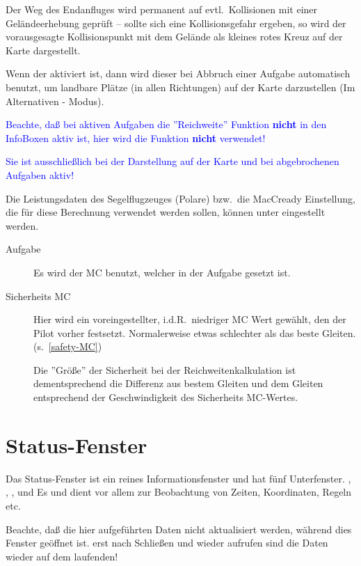 Der Weg des Endanfluges wird permanent auf evtl.\ Kollisionen mit einer Geländeerhebung geprüft -- sollte sich eine Kollisionsgefahr ergeben, so wird der vorausgesagte Kollisionspunkt mit dem Gelände als kleines rotes Kreuz auf der Karte dargestellt.

Wenn der  aktiviert ist, dann wird dieser bei Abbruch einer Aufgabe  automatisch benutzt, um landbare Plätze (in allen Richtungen) auf der Karte darzustellen (Im Alternativen - Modus).


\textcolor{blue}{Beachte, daß bei aktiven Aufgaben die ''Reichweite'' Funktion   \textbf{nicht} in den InfoBoxen aktiv ist, hier wird die Funktion \textbf{nicht} verwendet!}\warning 


\textcolor{blue}{Sie ist ausschließlich bei der Darstellung auf der Karte und bei abgebrochenen Aufgaben aktiv!}

Die Leistungsdaten des Segelflugzeuges (Polare) bzw.\ die MacCready Einstellung, die für diese Berechnung verwendet werden sollen, können unter %
 eingestellt werden. 
\begin{description}
\item[Aufgabe] Es wird der MC benutzt, welcher in der Aufgabe gesetzt ist.
\item[Sicherheits  MC] Hier wird ein voreingestellter, i.d.R.\ niedriger MC Wert gewählt, den der Pilot vorher festsetzt. Normalerweise etwas schlechter als das beste Gleiten. (s.~\ref{safety-MC}) 

Die ''Größe'' der Sicherheit bei der Reichweitenkalkulation ist dementsprechend   die Differenz aus bestem Gleiten und dem Gleiten entsprechend der Geschwindigkeit des Sicherheits MC-Wertes.
\end{description}
\section{Status-Fenster}\label{sec:aircr-stat-dial}

Das Status-Fenster ist ein reines Informationsfenster und hat fünf Unterfenster. , , ,  und  Es 
 und dient vor allem zur Beobachtung von Zeiten, Koordinaten, Regeln etc.\  
  
\achtung Beachte, daß die hier aufgeführten Daten nicht aktualisiert werden, während dies Fenster geöffnet ist. erst nach Schließen und wieder aufrufen sind die Daten wieder auf dem laufenden! 


